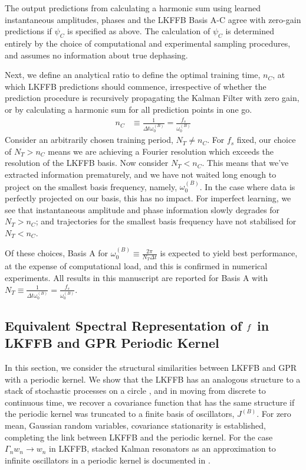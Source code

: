  The output predictions from calculating a harmonic sum using learned instantaneous amplitudes, phases and the LKFFB Basis A-C agree with zero-gain predictions if $\psi_C$ is specified as above. The calculation of $\psi_C$ is determined entirely by the choice of computational and experimental sampling procedures, and assumes no information about true dephasing.  
 
 Next, we define an analytical ratio to define the optimal training time, $n_C$, at which LKFFB predictions should commence, irrespective of whether the prediction procedure is recursively propagating the Kalman Filter with zero gain, or by calculating a harmonic sum for all prediction points in one go. 
 \begin{align}
 n_C &\equiv \frac{1}{\Delta t \omega_0^{(B)}} = \frac{f_s}{\omega_0^{(B)}} \label{eqn:sec:ap_liska_fixedbasis_nC}
 \end{align}
 Consider an arbitrarily chosen training period, $N_T \neq n_C $.  For $f_s$ fixed, our choice of $N_T > n_C $ means we are achieving a Fourier resolution which exceeds the resolution of the LKFFB basis. Now consider $N_T< n_C$. This means that we've extracted information prematurely, and we have not waited long enough to project on the smallest basis frequency, namely, $\omega_0^{(B)}$.  In the case where data is perfectly projected on our basis, this has no impact. For imperfect learning, we see that instantaneous amplitude and phase information slowly degrades for $N_T > n_C$; and trajectories for the smallest basis frequency have not stabilised for $N_T < n_C$. 
 
 Of these choices, Basis A for $\omega_0^{(B)} \equiv \frac{2\pi}{N_T \Delta t}$ is expected to yield best performance, at the expense of computational load, and this is confirmed in numerical experiments. All results in this manuscript are reported for Basis A with $N_T \equiv \frac{1}{\Delta t \omega_0^{(B)}} = \frac{f_s}{\omega_0^{(B)}} $.

\subsection{Equivalent Spectral Representation of $f$ in LKFFB and GPR Periodic Kernel}

In this section, we consider the structural similarities between LKFFB and GPR with a periodic kernel. We show that the LKFFB has an analogous structure to a stack of stochastic processes on a circle \cite{karlin1975first}, and in moving from discrete to continuous time, we recover a covariance function that has the same structure if the periodic kernel was truncated to a finite basis of oscillators, $J^{(B)}$. For zero mean, Gaussian random variables, covariance stationarity is established, completing the link between LKFFB and the periodic kernel. For the case $\Gamma_n w_n \to w_n$ in LKFFB,  stacked Kalman resonators as an approximation to infinite oscillators in a periodic kernel is documented in \cite{solin2014explicit}.

